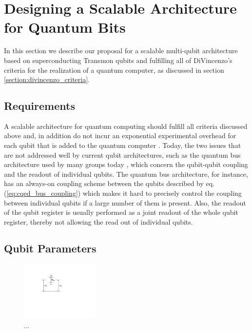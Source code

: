 \section{Designing a Scalable Architecture for Quantum Bits} \label{section:scalable_architecture}

In this section we describe our proposal for a scalable multi-qubit architecture based on superconducting Transmon qubits and fulfilling all of DiVincenzo's criteria for the realization of a quantum computer, as discussed in section \ref{section:divincenzo_criteria}. \citep{steane_how_2007}

\subsection{Requirements}

A scalable architecture for quantum computing should fulfill all criteria discussed above and, in addition do not incur an exponential experimental overhead for each qubit that is added to the quantum computer \citep{blume-kohout_climbing_2002}. Today, the two issues that are not addressed well by current qubit architectures, such as the quantum bus architecture used by many groups today \citep{dicarlo_demonstration_2009,wallraff_strong_2004}, which concern the qubit-qubit coupling and the readout of individual qubits. The quantum bus architecture, for instance, has an always-on coupling scheme between the qubits described by eq. (\ref{eq:cqed_bus_coupling}) which makes it hard to precisely control the coupling between individual qubits if a large number of them is present. Also, the readout of the qubit register is usually performed as a joint readout of the whole qubit register, thereby not allowing the read out of individual qubits.

\subsection{Qubit Parameters}

\begin{figure}
	\centering
	\includegraphics[width=0.35\textwidth]{./material/figures/scalable-architecture/qubit_molecule}
	\caption[...]{...}
	\label{fig:qubit_molecule_energies}
\end{figure}

